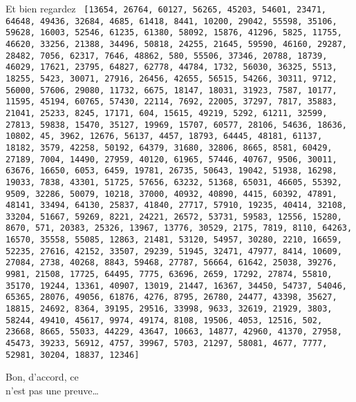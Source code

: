 \documentclass[12pt]{nsibeamer}
\begin{document}
\begin{frame}{Et bien regardez}
\tiny\texttt{
[13654, 26764, 60127, 56265, 45203, 54601, 23471, 64648, 49436, 32684, 4685, 61418, 8441, 10200, 29042, 55598, 35106, 59628, 16003, 52546, 61235, 61380, 58092, 15876, 41296, 5825, 11755, 46620, 33256, 21388, 34496, 50818, 24255, 21645, 59590, 46160, 29287, 28482, 7056, 62317, 7646, 48862, 580, 55506, 37346, 20788, 18739, 46029, 17621, 23795, 64827, 62778, 44784, 1732, 56030, 36325, 5513, 18255, 5423, 30071, 27916, 26456, 42655, 56515, 54266, 30311, 9712, 56000, 57606, 29080, 11732, 6675, 18147, 18031, 31923, 7587, 10177, 11595, 45194, 60765, 57430, 22114, 7692, 22005, 37297, 7817, 35883, 21041, 25233, 8245, 17171, 604, 15615, 49219, 5292, 61211, 32599, 27813, 59838, 15470, 35127, 19969, 15707, 60577, 28106, 54636, 18636, 10802, 45, 3962, 12676, 56137, 4457, 18793, 64445, 48181, 61137, 18182, 3579, 42258, 50192, 64379, 31680, 32806, 8665, 8581, 60429, 27189, 7004, 14490, 27959, 40120, 61965, 57446, 40767, 9506, 30011, 63676, 16650, 6053, 6459, 19781, 26735, 50643, 19042, 51938, 16298, 19033, 7838, 43301, 51725, 57656, 63232, 51368, 65031, 46605, 55392, 9509, 32286, 50079, 10218, 37000, 40932, 40890, 4415, 60392, 47891, 48141, 33494, 64130, 25837, 41840, 27717, 57910, 19235, 40414, 32108, 33204, 51667, 59269, 8221, 24221, 26572, 53731, 59583, 12556, 15280, 8670, 571, 20383, 25326, 13967, 13776, 30529, 2175, 7819, 8110, 64263, 16570, 35558, 55085, 12863, 21481, 53120, 54957, 30280, 2210, 16659, 52235, 27616, 42152, 33507, 29239, 51945, 32471, 47977, 8414, 10609, 27084, 2738, 40268, 8843, 59468, 27787, 56664, 61642, 25038, 39276, 9981, 21508, 17725, 64495, 7775, 63696, 2659, 17292, 27874, 55810, 35170, 19244, 13361, 40907, 13019, 21447, 16367, 34450, 54737, 54046, 65365, 28076, 49056, 61876, 4276, 8795, 26780, 24477, 43398, 35627, 18815, 24692, 8364, 39195, 29516, 33998, 9633, 32619, 21929, 3803, 58244, 49410, 45617, 9974, 49174, 8108, 19506, 4053, 12516, 502, 23668, 8665, 55033, 44229, 43647, 10663, 14877, 42960, 41370, 27958, 45473, 39233, 56912, 4757, 39967, 5703, 21297, 58081, 4677, 7777, 52981, 30204, 18837, 12346]}
\end{frame}

%

\begin{frame}[standout]
	\begin{center}
		\Huge
		Bon, d'accord, ce\\
		n'est pas une 
		preuve\ldots
		\normalsize
	\end{center}
\end{frame}
\end{document}

